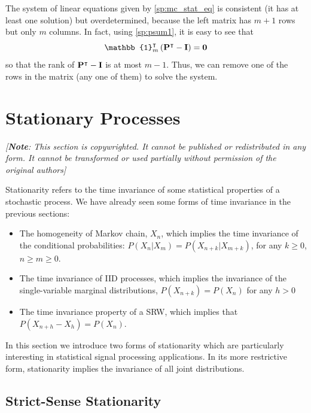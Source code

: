The system of linear equations given by \eqref{sp:mc_stat_eq} is consistent (it has at least one solution) but overdetermined, because the left matrix has $m+1$ rows but only $m$ columns. In fact, using \eqref{sp:psum1}, it is easy to see that 
\begin{equation}
\mathbb{1}_m^\intercal \left({\bf P}^\intercal - {\bf I}\right)  = {\bf 0}
\end{equation}
so that the rank of ${\bf P}^\intercal - {\bf I}$ is at most $m-1$. Thus, we can remove one of the rows in the matrix (any one of them) to solve the system.

\newpage


\section{Stationary Processes}

\textit{[\textbf{Note}: This section is copywrighted. It cannot be published or redistributed in any form. It cannot be transformed or used partially without permission of the original authors]}
\vspace{2cm}

Stationarity refers to the time invariance of some statistical properties of a stochastic process. We have already seen some forms of time invariance in the previous sections: 

\begin{itemize}
\item The homogeneity of Markov chain, $X_n$, which implies the time invariance of the conditional probabilities: $P(X_n|X_m) = P(X_{n+k}|X_{m+k})$, for any $k \ge 0$, $n \ge m \ge 0$. 
\item The time invariance of IID processes, which implies the invariance of the single-variable marginal distributions, $P(X_{n+k}) = P(X_n)$ for any $h>0$
\item The time invariance property of a SRW, which implies that $P(X_{n+h}-X_h) = P(X_n)$.
\end{itemize}

In this section we introduce two forms of stationarity which are particularly interesting in statistical signal processing applications. In its more restrictive form, stationarity implies the invariance of all joint distributions.

\subsection{Strict-Sense Stationarity}
\label{sec:Stationarity}

